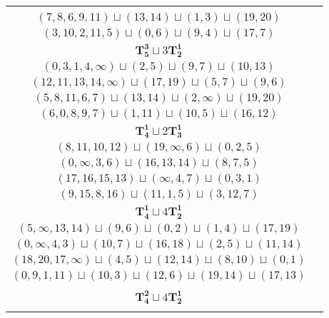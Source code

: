 \documentclass{article}
\begin{document}
\begin{longtable}{|c|c|}
\begin{tabular}{c}
        $(6,4,5,8,\infty)\sqcup(17,19)\sqcup(0,3)\sqcup(12,14)$ \\ 
        $(7,8,6,9,11)\sqcup(13,14)\sqcup(1,3)\sqcup(19,20)$ \\ 
        $(3,10,2,11,5)\sqcup(0,6)\sqcup(9,4)\sqcup(17,7)$
        \end{tabular} \\ 
        \hline
        $\mathbf{T_{5}^{3}} \sqcup 3\mathbf{T_{2}^{1}}$ & \begin{tabular}{c}
        $(1,\infty,13,5,7)\sqcup(2,3)\sqcup(16,15)\sqcup(9,11)$ \\ 
        $(0,3,1,4,\infty)\sqcup(2,5)\sqcup(9,7)\sqcup(10,13)$ \\ 
        $(12,11,13,14,\infty)\sqcup(17,19)\sqcup(5,7)\sqcup(9,6)$ \\ 
        $(5,8,11,6,7)\sqcup(13,14)\sqcup(2,\infty)\sqcup(19,20)$ \\ 
        $(6,0,8,9,7)\sqcup(1,11)\sqcup(10,5)\sqcup(16,12)$
        \end{tabular} \\ 
        \hline
        $\mathbf{T_{4}^{1}} \sqcup 2\mathbf{T_{3}^{1}}$ & \begin{tabular}{c}
        $(11,13,12,15)\sqcup(9,\infty,1)\sqcup(2,4,5)$ \\ 
        $(8,11,10,12)\sqcup(19,\infty,6)\sqcup(0,2,5)$ \\ 
        $(0,\infty,3,6)\sqcup(16,13,14)\sqcup(8,7,5)$ \\ 
        $(17,16,15,13)\sqcup(\infty,4,7)\sqcup(0,3,1)$ \\ 
        $(9,15,8,16)\sqcup(11,1,5)\sqcup(3,12,7)$
        \end{tabular} \\ 
        \hline
        $\mathbf{T_{4}^{1}} \sqcup 4\mathbf{T_{2}^{1}}$ & \begin{tabular}{c}
        $(9,\infty,8,6)\sqcup(12,15)\sqcup(16,17)\sqcup(1,2)\sqcup(19,20)$ \\ 
        $(5,\infty,13,14)\sqcup(9,6)\sqcup(0,2)\sqcup(1,4)\sqcup(17,19)$ \\ 
        $(0,\infty,4,3)\sqcup(10,7)\sqcup(16,18)\sqcup(2,5)\sqcup(11,14)$ \\ 
        $(18,20,17,\infty)\sqcup(4,5)\sqcup(12,14)\sqcup(8,10)\sqcup(0,1)$ \\ 
        $(0,9,1,11)\sqcup(10,3)\sqcup(12,6)\sqcup(19,14)\sqcup(17,13)$
        \end{tabular} \\ 
        \hline
        $\mathbf{T_{4}^{2}} \sqcup 4\mathbf{T_{2}^{1}}$ & \begin{tabular}{c}

\end{tabular}
\end{longtable}
\end{document}
